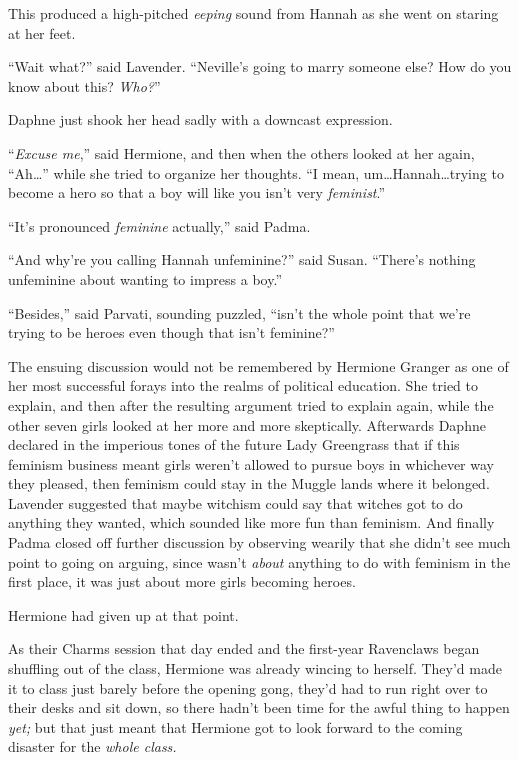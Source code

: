 This produced a high-pitched \emph{eeping} sound from Hannah as she went on staring at her feet.

“Wait what?” said Lavender. “Neville’s going to marry someone else? How do you know about this? \emph{Who?}”

Daphne just shook her head sadly with a downcast expression.

“\emph{Excuse me},” said Hermione, and then when the others looked at her again, “Ah…” while she tried to organize her thoughts. “I mean, um…Hannah…trying to become a hero so that a boy will like you isn’t very \emph{feminist}.”

“It’s pronounced \emph{feminine} actually,” said Padma.

“And why’re you calling Hannah unfeminine?” said Susan. “There’s nothing unfeminine about wanting to impress a boy.”

“Besides,” said Parvati, sounding puzzled, “isn’t the whole point that we’re trying to be heroes even though that isn’t feminine?”

The ensuing discussion would not be remembered by Hermione Granger as one of her most successful forays into the realms of political education. She tried to explain, and then after the resulting argument tried to explain again, while the other seven girls looked at her more and more skeptically. Afterwards Daphne declared in the imperious tones of the future Lady Greengrass that if this feminism business meant girls weren’t allowed to pursue boys in whichever way they pleased, then feminism could stay in the Muggle lands where it belonged. Lavender suggested that maybe witchism could say that witches got to do anything they wanted, which sounded like more fun than feminism. And finally Padma closed off further discussion by observing wearily that she didn’t see much point to going on arguing, since \SPHEW{} wasn’t \emph{about} anything to do with feminism in the first place, it was just about more girls becoming heroes.

Hermione had given up at that point.

\later

As their Charms session that day ended and the first-year Ravenclaws began shuffling out of the class, Hermione was already wincing to herself. They’d made it to class just barely before the opening gong, they’d had to run right over to their desks and sit down, so there hadn’t been time for the awful thing to happen \emph{yet;} but that just meant that Hermione got to look forward to the coming disaster for the \emph{whole class.}

